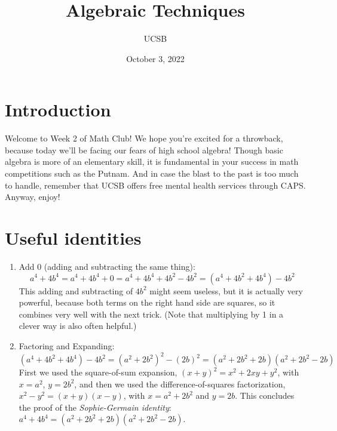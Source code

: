 \documentclass{article}
\title{Algebraic Techniques}
\author{UCSB}
\date{October 3, 2022}
\begin{document}
\section{Introduction}
Welcome to Week 2 of Math Club! We hope you're excited for a throwback, because today we'll be facing our fears of high school algebra! Though basic algebra is more of an elementary skill, it is fundamental 
in your success in math competitions such as the Putnam. And in case the blast to the past is too much to handle, remember that UCSB offers free mental health services through CAPS. Anyway, enjoy!

\section{Useful identities}
\begin{enumerate}[label=\Roman*.]
    \item Add \(0\) (adding and subtracting the same thing): \[a^4+4b^4 = a^4 + 4b^4 + 0 = a^4 + 4b^4 + 4b^2-4b^2 = (a^4+ 4b^2 + 4b^4) - 4b^2\]
    This adding and subtracting of $4b^2$ might seem useless, but it is actually very powerful, because both terms on the right hand side are squares, so it combines very well with the next trick.
    (Note that multiplying by 1 in a clever way is also often helpful.)
    \item Factoring and Expanding: 
    \[(a^4 + 4b^2 + 4b^4) - 4b^2 = (a^2+2b^2)^2 - (2b)^2 = (a^2 + 2b^2 + 2b)(a^2+2b^2-2b)\]
    First we used the square-of-sum expansion, $(x+y)^2 = x^2 + 2xy + y^2$, with $x=a^2$, $y=2b^2$, and then we used the difference-of-squares factorization, $x^2-y^2 = (x+y)(x-y)$, with $x=a^2+2b^2$ and $y=2b$. This concludes the proof of the \emph{Sophie-Germain identity}: $a^4+4b^4 = (a^2+2b^2 + 2b)(a^2+2b^2-2b)$.
    

\end{enumerate}
\end{document}
